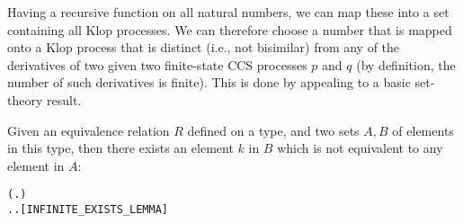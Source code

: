 Having
 a recursive function  on all natural numbers,
  we can map these into a set containing  all Klop processes. 
We can therefore 
choose a number that is mapped onto a Klop process
that is distinct (i.e., not bisimilar)  from 
any  of the derivatives of two  given 
two finite-state CCS processes $p$ and $q$
(by definition, the number of such derivatives is finite).
This is done by 
appealing to a basic set-theory result.

\begin{lemma}
Given an equivalence relation $R$ defined on a type, and two sets $A, B$
of elements in this type, 
 then there exists an element $k$ in $B$
which is not equivalent to any element in $A$:
\begin{alltt}
\HOLTokenTurnstile{}   \HOLSymConst{\HOLTokenImp{}}
     \HOLSymConst{\HOLTokenConj{}}   \HOLSymConst{\HOLTokenConj{}}
   (\HOLSymConst{\HOLTokenForall{}} .  \HOLSymConst{\HOLTokenIn{}}  \HOLSymConst{\HOLTokenConj{}}  \HOLSymConst{\HOLTokenIn{}}  \HOLSymConst{\HOLTokenConj{}}  \HOLSymConst{\HOLTokenNotEqual{}}  \HOLSymConst{\HOLTokenImp{}} \HOLSymConst{\HOLTokenNeg{}}  ) \HOLSymConst{\HOLTokenImp{}}
   \HOLSymConst{\HOLTokenExists{}}.  \HOLSymConst{\HOLTokenIn{}}  \HOLSymConst{\HOLTokenConj{}} \HOLSymConst{\HOLTokenForall{}}.  \HOLSymConst{\HOLTokenIn{}}  \HOLSymConst{\HOLTokenImp{}} \HOLSymConst{\HOLTokenNeg{}}  \hfill[INFINITE_EXISTS_LEMMA]
\end{alltt}
\end{lemma}

